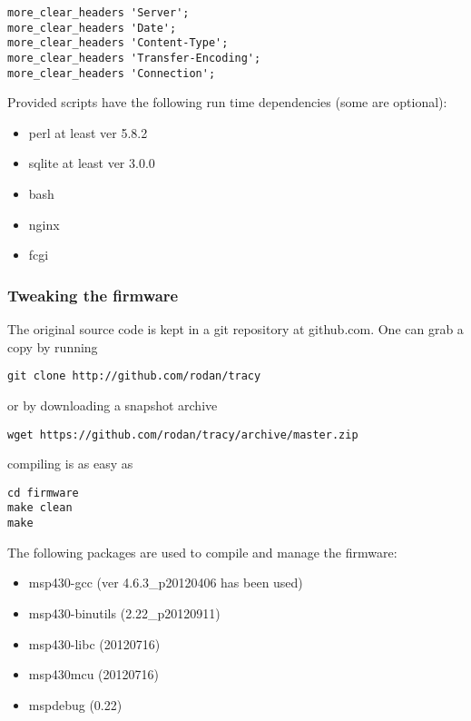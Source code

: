 \documentclass[a4paper,twoside]{refart}
\begin{document}
\begin{lstlisting}
more_clear_headers 'Server';
more_clear_headers 'Date';
more_clear_headers 'Content-Type';
more_clear_headers 'Transfer-Encoding';
more_clear_headers 'Connection';
\end{lstlisting}

Provided scripts have the following run time dependencies (some are optional):

\begin{itemize}
    \item perl at least ver 5.8.2
    \item sqlite at least ver 3.0.0
    \item bash
    \item nginx
    \item fcgi
\end{itemize}

\subsubsection{Tweaking the firmware}

The original source code is kept in a git repository at github.com.
One can grab a copy by running

\begin{lstlisting}
git clone http://github.com/rodan/tracy
\end{lstlisting} 

or by downloading a snapshot archive

\begin{lstlisting}
wget https://github.com/rodan/tracy/archive/master.zip
\end{lstlisting} 

compiling is as easy as
\begin{lstlisting}
cd firmware
make clean
make
\end{lstlisting} 

The following packages are used to compile and manage the firmware:

\begin{itemize}
    \item msp430-gcc (ver 4.6.3\_p20120406 has been used)
    \item msp430-binutils (2.22\_p20120911)
    \item msp430-libc (20120716)
    \item msp430mcu (20120716)
    \item mspdebug (0.22)
\end{itemize}
\end{document}
